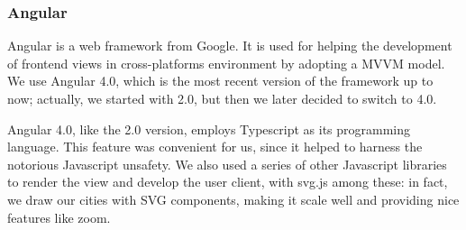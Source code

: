 \subsubsection{Angular}

Angular is a web framework from Google. It is used for helping the development
of frontend views in cross-platforms environment by adopting a MVVM model.
We use Angular 4.0, which is the most recent version of the framework up to
now; actually, we started with 2.0, but then we later decided to switch to
4.0.

Angular 4.0, like the 2.0 version, employs Typescript as its programming
language. This feature was convenient for us, since it helped to harness the
notorious Javascript unsafety.
We also used a series of other Javascript libraries to render the view and
develop the user client, with svg.js among these: in fact, we draw our cities
with SVG components, making it scale well and providing nice features like
zoom.

